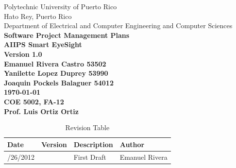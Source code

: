 \documentclass[12pt]{article}
\begin{document}
\begin{titlepage}
 \centering
 Polytechnic University of Puerto Rico\\
 Hato Rey, Puerto Rico\\
 Department of Electrical and Computer Engineering and Computer Sciences\\
    \vspace*{15\baselineskip}
    \large
    \bfseries
    Software Project Management Plans  \\
    AIIPS Smart EyeSight\\
    Version 1.0\\[3\baselineskip]
    \normalfont
     \vfill
    Emanuel Rivera Castro 53502 \\
    Yanilette Lopez Duprey 53990\\
    Joaquin Pockels Balaguer 54012\\[2\baselineskip]

    \textbf{\today} \\
    COE 5002, FA-12\\
    Prof. Luis Ortiz Ortiz\\[2\baselineskip]
\end{titlepage}

\clearpage{}
\setcounter{page}{2}
\begin{table}[H]\centering
\begin{tabular}{|>{\centering\arraybackslash}m{3cm}|>{\centering\arraybackslash}m{3cm}|
>{\centering\arraybackslash}m{3cm}|>{\centering\arraybackslash}m{3cm}|}
  \hline
  Date & Version & Description & Author \\
   \hline
   9/26/2012 & 1.0 & First Draft & Emanuel Rivera \\
   \hline
\end{tabular}
\caption[]{Revision Table}
\end{table}
\pagebreak
\tableofcontents
\pagebreak
\listoftables
\pagebreak
\listoffigures
\clearpage{}
\end{document}
